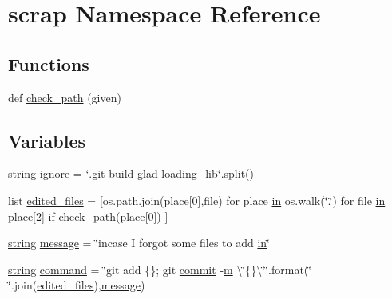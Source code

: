 \hypertarget{namespacescrap}{}\section{scrap Namespace Reference}
\label{namespacescrap}
\subsection*{Functions}
\begin{DoxyCompactItemize}
\item 
def \mbox{\hyperlink{namespacescrap_a32ed8c257e2ca3d4484dca9a4ba5b624}{check\+\_\+path}} (given)
\end{DoxyCompactItemize}
\subsection*{Variables}
\begin{DoxyCompactItemize}
\item 
\mbox{\hyperlink{glad_8h_ae84541b4f3d8e1ea24ec0f466a8c568b}{string}} \mbox{\hyperlink{namespacescrap_a7ccf9c21ee2bf2e2a8a3df42f1d7e7a9}{ignore}} = \char`\"{}.git build glad loading\+\_\+lib\char`\"{}.split()
\item 
list \mbox{\hyperlink{namespacescrap_a7a72c539742d79b4921ff0e4461bcbee}{edited\+\_\+files}} = \mbox{[}os.\+path.\+join(place\mbox{[}0\mbox{]},file) for place \mbox{\hyperlink{glad_8h_a83ad0ee7f1e06b59c90271716e689080}{in}} os.\+walk(\char`\"{}.\char`\"{}) for file \mbox{\hyperlink{glad_8h_a83ad0ee7f1e06b59c90271716e689080}{in}} place\mbox{[}2\mbox{]} if \mbox{\hyperlink{namespacescrap_a32ed8c257e2ca3d4484dca9a4ba5b624}{check\+\_\+path}}(place\mbox{[}0\mbox{]}) \mbox{]}
\item 
\mbox{\hyperlink{glad_8h_ae84541b4f3d8e1ea24ec0f466a8c568b}{string}} \mbox{\hyperlink{namespacescrap_ad2ffb1c34088330deac4caf40a6be164}{message}} = \char`\"{}incase I forgot some files to add \mbox{\hyperlink{glad_8h_a83ad0ee7f1e06b59c90271716e689080}{in}}\char`\"{}
\item 
\mbox{\hyperlink{glad_8h_ae84541b4f3d8e1ea24ec0f466a8c568b}{string}} \mbox{\hyperlink{namespacescrap_a9f58e341a42be029584e388bc72153a7}{command}} = \char`\"{}git add \{\}; git \mbox{\hyperlink{glad_8h_a5c56d586c7b2588c4f0413e1a92fd181}{commit}} -\/\mbox{\hyperlink{glad_8h_a11941354c1d09e70ec63bde35fc79d4f}{m}} \textbackslash{}\char`\"{}\{\}\textbackslash{}\char`\"{}\char`\"{}.format(\char`\"{} \char`\"{}.join(\mbox{\hyperlink{namespacescrap_a7a72c539742d79b4921ff0e4461bcbee}{edited\+\_\+files}}),\mbox{\hyperlink{glad_8h_a7b6161cffb9b8aee272b3b916183d28c}{message}})
\end{DoxyCompactItemize}



